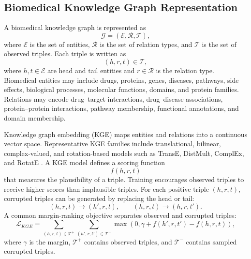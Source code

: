 \subsection{Biomedical Knowledge Graph Representation}

A biomedical knowledge graph is represented as
\begin{equation}
    \mathcal{G}
    =
    (\mathcal{E},\mathcal{R},\mathcal{T}),
\end{equation}
where $\mathcal{E}$ is the set of entities, $\mathcal{R}$ is the set of relation types, and $\mathcal{T}$ is the set of observed triples. Each triple is written as
\begin{equation}
    (h,r,t) \in \mathcal{T},
\end{equation}
where $h,t\in\mathcal{E}$ are head and tail entities and $r\in\mathcal{R}$ is the relation type. Biomedical entities may include drugs, proteins, genes, diseases, pathways, side effects, biological processes, molecular functions, domains, and protein families. Relations may encode drug--target interactions, drug--disease associations, protein--protein interactions, pathway membership, functional annotations, and domain membership.

Knowledge graph embedding (KGE) maps entities and relations into a continuous vector space. Representative KGE families include translational, bilinear, complex-valued, and rotation-based models such as TransE, DistMult, ComplEx, and RotatE \cite{bordes2013translating,YangYHGD14a,trouillon2016complex,sun2019rotate}. A KGE model defines a scoring function
\begin{equation}
    f(h,r,t)
\end{equation}
that measures the plausibility of a triple. Training encourages observed triples to receive higher scores than implausible triples. For each positive triple $(h,r,t)$, corrupted triples can be generated by replacing the head or tail:
\begin{equation}
    (h,r,t)
    \rightarrow
    (h',r,t),
    \qquad
    (h,r,t)
    \rightarrow
    (h,r,t').
\end{equation}
A common margin-ranking objective separates observed and corrupted triples:
\begin{equation}
    \mathcal{L}_{KGE}
    =
    \sum_{(h,r,t)\in\mathcal{T}^{+}}
    \sum_{(h',r,t')\in\mathcal{T}^{-}}
    \max
    \left(
        0,
        \gamma
        +f(h',r,t')
        -f(h,r,t)
    \right),
    \label{eq:background_kge_loss}
\end{equation}
where $\gamma$ is the margin, $\mathcal{T}^{+}$ contains observed triples, and $\mathcal{T}^{-}$ contains sampled corrupted triples.

